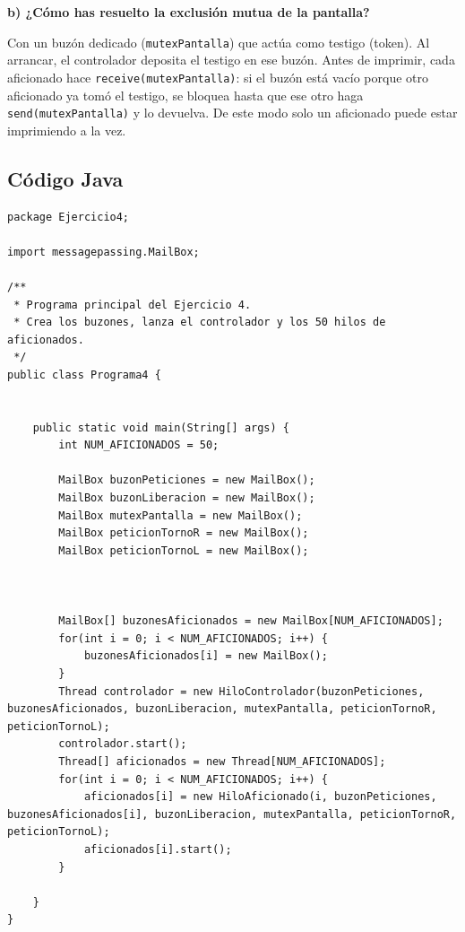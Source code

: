 \documentclass[12pt,a4paper]{article}
\begin{document}
\textbf{b) ¿Cómo has resuelto la exclusión mutua de la pantalla?}

Con un buzón dedicado (\texttt{mutexPantalla}) que actúa como testigo (token). Al arrancar, el controlador deposita el testigo en ese buzón. Antes de imprimir, cada aficionado hace \texttt{receive(mutexPantalla)}: si el buzón está vacío porque otro aficionado ya tomó el testigo, se bloquea hasta que ese otro haga \texttt{send(mutexPantalla)} y lo devuelva. De este modo solo un aficionado puede estar imprimiendo a la vez.

\subsection{Código Java}


\begin{lstlisting}[caption={Programa4.java}]
package Ejercicio4;

import messagepassing.MailBox;

/**
 * Programa principal del Ejercicio 4.
 * Crea los buzones, lanza el controlador y los 50 hilos de aficionados.
 */
public class Programa4 {


    public static void main(String[] args) {
        int NUM_AFICIONADOS = 50;

        MailBox buzonPeticiones = new MailBox();
        MailBox buzonLiberacion = new MailBox();
        MailBox mutexPantalla = new MailBox();
    	MailBox peticionTornoR = new MailBox();
        MailBox peticionTornoL = new MailBox();



        MailBox[] buzonesAficionados = new MailBox[NUM_AFICIONADOS];
        for(int i = 0; i < NUM_AFICIONADOS; i++) {
        	buzonesAficionados[i] = new MailBox();
        }
        Thread controlador = new HiloControlador(buzonPeticiones, buzonesAficionados, buzonLiberacion, mutexPantalla, peticionTornoR, peticionTornoL);
        controlador.start();
        Thread[] aficionados = new Thread[NUM_AFICIONADOS];
        for(int i = 0; i < NUM_AFICIONADOS; i++) {
        	aficionados[i] = new HiloAficionado(i, buzonPeticiones, buzonesAficionados[i], buzonLiberacion, mutexPantalla, peticionTornoR, peticionTornoL);
        	aficionados[i].start();
        }
  
    }
}

\end{lstlisting}
\end{document}
